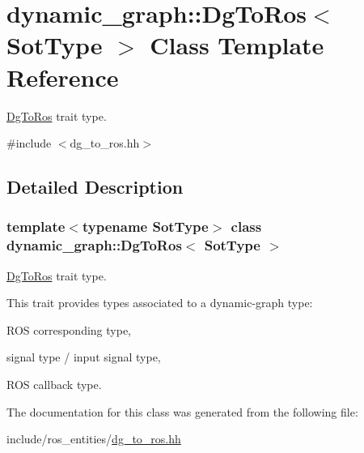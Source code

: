 \hypertarget{classdynamic__graph_1_1DgToRos}{}\section{dynamic\+\_\+graph\+:\+:Dg\+To\+Ros$<$ Sot\+Type $>$ Class Template Reference}
\label{classdynamic__graph_1_1DgToRos}


\hyperlink{classdynamic__graph_1_1DgToRos}{Dg\+To\+Ros} trait type.  




{\ttfamily \#include $<$dg\+\_\+to\+\_\+ros.\+hh$>$}



\subsection{Detailed Description}
\subsubsection*{template$<$typename Sot\+Type$>$\newline
class dynamic\+\_\+graph\+::\+Dg\+To\+Ros$<$ Sot\+Type $>$}

\hyperlink{classdynamic__graph_1_1DgToRos}{Dg\+To\+Ros} trait type. 

This trait provides types associated to a dynamic-\/graph type\+:
\begin{DoxyItemize}
\item R\+OS corresponding type,
\item signal type / input signal type,
\item R\+OS callback type. 
\end{DoxyItemize}

The documentation for this class was generated from the following file\+:\begin{DoxyCompactItemize}
\item 
include/ros\+\_\+entities/\hyperlink{dg__to__ros_8hh}{dg\+\_\+to\+\_\+ros.\+hh}\end{DoxyCompactItemize}
